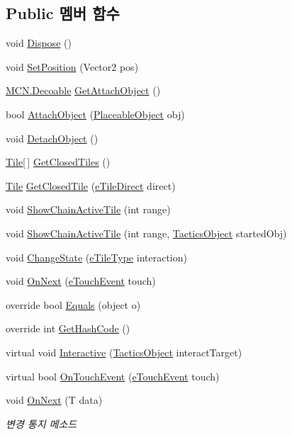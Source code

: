 \subsection*{Public 멤버 함수}
\begin{DoxyCompactItemize}
\item 
void \hyperlink{class_tile_a6e8a801e95a29156cbf32024e45c6596}{Dispose} ()
\item 
void \hyperlink{class_tile_a4d7a81b36513066aad741ed675164690}{Set\+Position} (Vector2 pos)
\item 
\hyperlink{class_m_c_n_1_1_decoable}{M\+C\+N.\+Decoable} \hyperlink{class_tile_a6c6758ca210a37d98f8e73e87c65f1d2}{Get\+Attach\+Object} ()
\item 
bool \hyperlink{class_tile_a1969ee41c320c6e7748a33374942e07e}{Attach\+Object} (\hyperlink{class_placeable_object}{Placeable\+Object} obj)
\item 
void \hyperlink{class_tile_ab8ab187ab674cfb222f761feac3b20b3}{Detach\+Object} ()
\item 
\hyperlink{class_tile}{Tile}\mbox{[}$\,$\mbox{]} \hyperlink{class_tile_a38b9f5c215f16448118e83e0d10aed05}{Get\+Closed\+Tiles} ()
\item 
\hyperlink{class_tile}{Tile} \hyperlink{class_tile_a838aaa6a94321629d04e944ed3bf8b9f}{Get\+Closed\+Tile} (\hyperlink{_tile_8cs_a082f743a62d2d8e13dac8fd38af246d7}{e\+Tile\+Direct} direct)
\item 
void \hyperlink{class_tile_a0ca6f4d1ddb0e7609749f1cf583b3c16}{Show\+Chain\+Active\+Tile} (int range)
\item 
void \hyperlink{class_tile_a6172e6a33d37d2992a1b0b6f5c2ed117}{Show\+Chain\+Active\+Tile} (int range, \hyperlink{class_tactics_object}{Tactics\+Object} started\+Obj)
\item 
void \hyperlink{class_tile_a2bb5c747e9483b803ea65b4341ce5af6}{Change\+State} (\hyperlink{_tile_8cs_a271bc07be325bca511bcb747e0ff2fda}{e\+Tile\+Type} interaction)
\item 
void \hyperlink{class_tile_a6133171796d47353aa5d57cd336e0a07}{On\+Next} (\hyperlink{_touch_manager_8cs_ae33e321a424fe84ba8b2fdb81ad40a68}{e\+Touch\+Event} touch)
\item 
override bool \hyperlink{class_tactics_object_aa445b127fafc61d84a064b423a155c1a}{Equals} (object o)
\item 
override int \hyperlink{class_tactics_object_a5fe0e8c99cec56daa7909754f037ac26}{Get\+Hash\+Code} ()
\item 
virtual void \hyperlink{class_tactics_object_a5f94ed01497a7072a2785163f4cbc57b}{Interactive} (\hyperlink{class_tactics_object}{Tactics\+Object} interact\+Target)
\item 
virtual bool \hyperlink{class_tactics_object_af34052e62ea471d21e4c601cc79ff717}{On\+Touch\+Event} (\hyperlink{_touch_manager_8cs_ae33e321a424fe84ba8b2fdb81ad40a68}{e\+Touch\+Event} touch)
\item 
void \hyperlink{interface_m_c_n_1_1_i_observer_a2f934b71aa4ddf6f936670d32c3cdff7}{On\+Next} (T data)
\begin{DoxyCompactList}\small\item\em 변경 통지 메소드 \end{DoxyCompactList}\end{DoxyCompactItemize}
